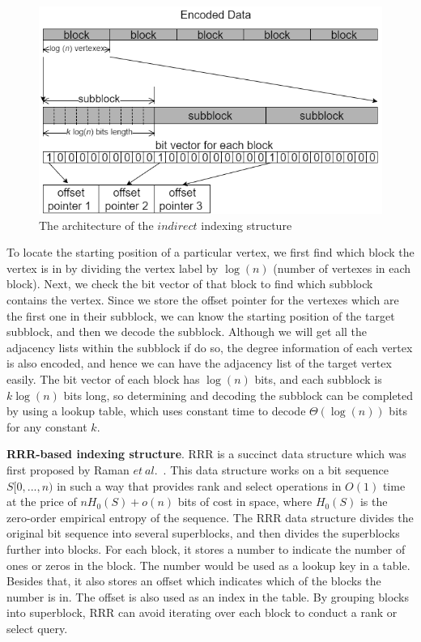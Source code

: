 \documentclass[12pt,glossary]{dalthesis}
\begin{document}
\bigskip

\begin{figure}[ht]
\centering
\includegraphics[width=1.0\textwidth]{indirect}
\caption{The architecture of the $indirect$ indexing structure}
\end{figure}

\bigskip

To locate the starting position of a particular vertex, we first find which block the vertex is in by dividing the vertex label by $\log(n)$ (number of vertexes in each block). Next, we check the bit vector of that block to find which subblock contains the vertex. Since we store the offset pointer for the vertexes which are the first one in their subblock, we can know the starting position of the target subblock, and then we decode the subblock. Although we will get all the adjacency lists within the subblock if do so, the degree information of each vertex is also encoded, and hence we can have the adjacency list of the target vertex easily. The bit vector of each block has $\log(n)$ bits, and each subblock is $k\log(n)$ bits long, so determining and decoding the subblock can be completed by using a lookup table, which uses constant time to decode $\Theta(\log(n))$ bits for any constant $k$.              

\bigskip
\bigskip

\textbf{RRR-based indexing structure}. RRR is a succinct data structure which was first proposed by Raman $et \ al$.~\cite{RRR}. This data structure works on a bit sequence $S[0,...,n)$ in such a way that provides rank and select operations in $O(1)$ time at the price of $nH_{0}(S)+o(n)$ bits of cost in space, where $H_{0}(S)$ is the zero-order empirical entropy of the sequence. The RRR data structure divides the original bit sequence into several superblocks, and then divides the superblocks further into blocks. For each block, it stores a number to indicate the number of ones or zeros in the block. The number would be used as a lookup key in a table. Besides that, it also stores an offset which indicates which of the blocks the number is in. The offset is also used as an index in the table. By grouping blocks into superblock, RRR can avoid iterating over each block to conduct a rank or select query. 
\end{document}

